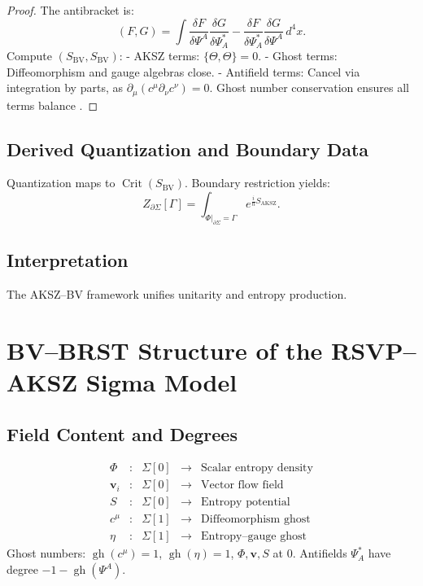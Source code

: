 \documentclass[12pt]{article}
\begin{document}
\begin{proof}
The antibracket is:
\[
(F, G) = \int \frac{\delta F}{\delta \Psi^A} \frac{\delta G}{\delta \Psi_A^*} - \frac{\delta F}{\delta \Psi_A^*} \frac{\delta G}{\delta \Psi^A} \, d^4x.
\]
Compute \((S_{\mathrm{BV}}, S_{\mathrm{BV}})\):
- AKSZ terms: \(\{\Theta, \Theta\} = 0\).
- Ghost terms: Diffeomorphism and gauge algebras close.
- Antifield terms: Cancel via integration by parts, as \(\partial_\mu (c^\mu \partial_\nu c^\nu) = 0\). Ghost number conservation ensures all terms balance \citep{Alexandrov1997}.
\end{proof}

\subsection{Derived Quantization and Boundary Data}

Quantization maps to \(\operatorname{Crit}(S_{\mathrm{BV}})\). Boundary restriction yields:
\[
Z_{\partial \Sigma}[\Gamma] = \int_{\Phi|_{\partial \Sigma} = \Gamma} e^{\frac{i}{\hbar} S_{\mathrm{AKSZ}}}.
\]

\subsection{Interpretation}

The AKSZ–BV framework unifies unitarity and entropy production.

\section{BV–BRST Structure of the RSVP–AKSZ Sigma Model}
\label{app:bv-brst}

\subsection{Field Content and Degrees}

\[
\begin{array}{rclcl}
\Phi &:& \Sigma[0] &\to& \text{Scalar entropy density} \\
\mathbf{v}_i &:& \Sigma[0] &\to& \text{Vector flow field} \\
S &:& \Sigma[0] &\to& \text{Entropy potential} \\
c^\mu &:& \Sigma[1] &\to& \text{Diffeomorphism ghost} \\
\eta &:& \Sigma[1] &\to& \text{Entropy–gauge ghost}
\end{array}
\]
Ghost numbers: \(\operatorname{gh}(c^\mu) = 1\), \(\operatorname{gh}(\eta) = 1\), \(\Phi, \mathbf{v}, S\) at 0. Antifields \(\Psi_A^*\) have degree \(-1 - \operatorname{gh}(\Psi^A)\).
\end{document}
